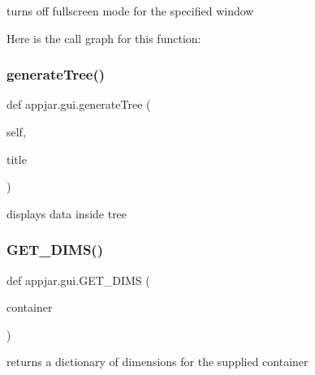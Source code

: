 \begin{DoxyVerb}turns off fullscreen mode for the specified window \end{DoxyVerb}
 Here is the call graph for this function\+:
\mbox{\label{classappjar_1_1gui_af9ca9cbf56054fda8f983fca10c41928}} 
\subsubsection{\texorpdfstring{generate\+Tree()}{generateTree()}}
{\footnotesize\ttfamily def appjar.\+gui.\+generate\+Tree (\begin{DoxyParamCaption}\item[{}]{self,  }\item[{}]{title }\end{DoxyParamCaption})}

\begin{DoxyVerb}displays data inside tree \end{DoxyVerb}
 \mbox{\label{classappjar_1_1gui_a3a4fac9114cd9cbc969525514abad562}} 
\subsubsection{\texorpdfstring{G\+E\+T\+\_\+\+D\+I\+M\+S()}{GET\_DIMS()}}
{\footnotesize\ttfamily def appjar.\+gui.\+G\+E\+T\+\_\+\+D\+I\+MS (\begin{DoxyParamCaption}\item[{}]{container }\end{DoxyParamCaption})\hspace{0.3cm}{\ttfamily [static]}}

\begin{DoxyVerb}returns a dictionary of dimensions for the supplied container \end{DoxyVerb}
 \mbox{\label{classappjar_1_1gui_a881a81f3d01fcf73cc17ad48317eee12}} 
